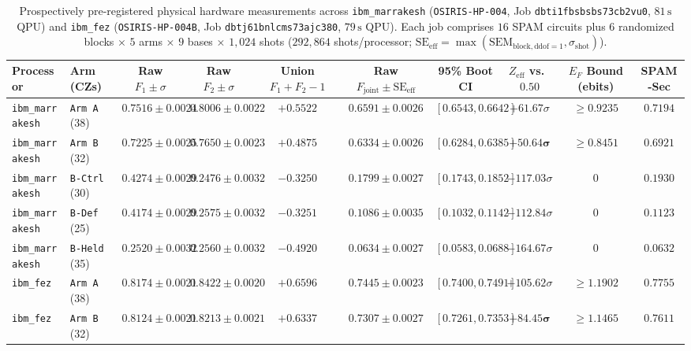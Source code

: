 \documentclass[11pt,twocolumn]{article}
\begin{document}
\begin{table}[t]
\centering
\caption{Prospectively pre-registered physical hardware measurements across \texttt{ibm\_marrakesh} (\texttt{OSIRIS-HP-004}, Job \texttt{dbti1fbsbsbs73cb2vu0}, $81\,\text{s}$ QPU) and \texttt{ibm\_fez} (\texttt{OSIRIS-HP-004B}, Job \texttt{dbtj61bnlcms73ajc380}, $79\,\text{s}$ QPU). Each job comprises $16$ SPAM circuits plus $6$ randomized blocks $\times$ $5$ arms $\times$ $9$ bases $\times$ $1{,}024$ shots ($292{,}864$ shots/processor; $\mathrm{SE}_{\mathrm{eff}}=\max(\mathrm{SEM}_{\mathrm{block,ddof=1}},\sigma_{\mathrm{shot}})$).}
\label{tab:results}
\footnotesize
\begin{tabular}{@{}llcccccccc@{}}
\toprule
\textbf{Processor} & \textbf{Arm (CZs)} & \textbf{Raw $F_1 \pm \sigma$} & \textbf{Raw $F_2 \pm \sigma$} & \textbf{Union $F_1\!+\!F_2\!-\!1$} & \textbf{Raw $F_{\mathrm{joint}} \pm \mathrm{SE}_{\mathrm{eff}}$} & \textbf{95\% Boot CI} & \textbf{$Z_{\mathrm{eff}}$ vs.\ $0.50$} & \textbf{$E_F$ Bound (ebits)} & \textbf{SPAM-Sec} \\
\midrule
\texttt{ibm\_marrakesh} & \texttt{Arm A} (38) & $0.7516 \pm 0.0024$ & $0.8006 \pm 0.0022$ & $+0.5522$ & $\mathbf{0.6591 \pm 0.0026}$ & $[0.6543, 0.6642]$ & $+61.67\sigma$ & $\ge 0.9235$ & $0.7194$ \\
\texttt{ibm\_marrakesh} & \texttt{Arm B} (32) & $0.7225 \pm 0.0025$ & $0.7650 \pm 0.0023$ & $+0.4875$ & $\mathbf{0.6334 \pm 0.0026}$ & $[0.6284, 0.6385]$ & $\mathbf{+50.64\sigma}$ & $\ge 0.8451$ & $0.6921$ \\
\texttt{ibm\_marrakesh} & \texttt{B-Ctrl} (30) & $0.4274 \pm 0.0029$ & $0.2476 \pm 0.0032$ & $-0.3250$ & $\mathbf{0.1799 \pm 0.0027}$ & $[0.1743, 0.1852]$ & $-117.03\sigma$ & $0$ & $0.1930$ \\
\texttt{ibm\_marrakesh} & \texttt{B-Def} (25) & $0.4174 \pm 0.0029$ & $0.2575 \pm 0.0032$ & $-0.3251$ & $\mathbf{0.1086 \pm 0.0035}$ & $[0.1032, 0.1142]$ & $-112.84\sigma$ & $0$ & $0.1123$ \\
\texttt{ibm\_marrakesh} & \texttt{B-Held} (35) & $0.2520 \pm 0.0032$ & $0.2560 \pm 0.0032$ & $-0.4920$ & $\mathbf{0.0634 \pm 0.0027}$ & $[0.0583, 0.0688]$ & $-164.67\sigma$ & $0$ & $0.0632$ \\
\midrule
\texttt{ibm\_fez} & \texttt{Arm A} (38) & $0.8174 \pm 0.0021$ & $0.8422 \pm 0.0020$ & $+0.6596$ & $\mathbf{0.7445 \pm 0.0023}$ & $[0.7400, 0.7491]$ & $+105.62\sigma$ & $\mathbf{\ge 1.1902}$ & $0.7755$ \\
\texttt{ibm\_fez} & \texttt{Arm B} (32) & $0.8124 \pm 0.0021$ & $0.8213 \pm 0.0021$ & $\mathbf{+0.6337}$ & $\mathbf{0.7307 \pm 0.0027}$ & $[0.7261, 0.7353]$ & $\mathbf{+84.45\sigma}$ & $\mathbf{\ge 1.1465}$ & $0.7611$ \\

\end{tabular}
\end{table}
\end{document}
